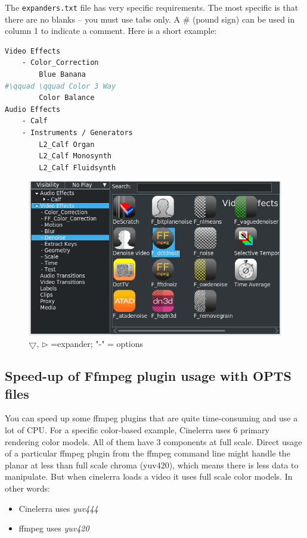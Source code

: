 The \texttt{expanders.txt} file has very specific requirements. The most specific is that there are no blanks -- you must use tabs only. A \# (pound sign) can be used in column 1 to indicate a comment. Here is a short example:

\begin{lstlisting}[language=Bash,numbers=none]
Video Effects
    - Color_Correction
        Blue Banana
#\qquad \qquad Color 3 Way
        Color Balance
Audio Effects
    - Calf
    - Instruments / Generators
        L2_Calf Organ
        L2_Calf Monosynth
        L2_Calf Fluidsynth
\end{lstlisting}

\begin{figure}[htpb]
    \centering
    \includegraphics[width=0.8\linewidth]{images/expander.png}
    \caption{$\bigtriangledown$, $\rhd$ =expander; "-" = options}
    \label{fig:expander}
\end{figure}

\subsection{Speed-up of Ffmpeg plugin usage with OPTS files}%
\label{sub:speedup_ffmpeg_plugin_opts}

You can speed up some ffmpeg plugins that are quite time-consuming and use a lot of CPU. For a specific color-based example, Cinelerra uses 6 primary rendering color models. All of them have 3 components at full scale. Direct usage of a particular ffmpeg plugin from the ffmpeg command line might handle the planar at less than full scale chroma (yuv420), which means there is less data to manipulate. But when cinelerra loads a video it uses full scale color models. In other words:

\begin{itemize}[noitemsep]
    \item Cinelerra uses \textit{yuv444}
    \item ffmpeg uses \textit{yuv420}
\end{itemize}

